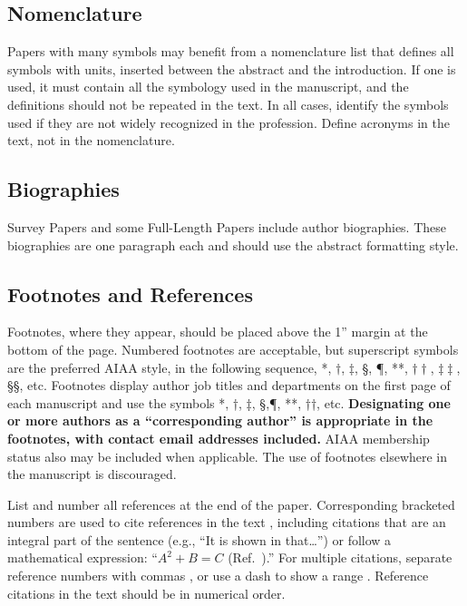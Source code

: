 \documentclass[journal ]{new-aiaa}
\begin{document}
\subsection{Nomenclature}
Papers with many symbols may benefit from a nomenclature list that defines all symbols with units, inserted between the abstract and the introduction. If one is used, it must contain all the symbology used in the manuscript, and the definitions should not be repeated in the text. In all cases, identify the symbols used if they are not widely recognized in the profession. Define acronyms in the text, not in the nomenclature. 

\subsection{Biographies}
Survey Papers and some Full-Length Papers include author biographies. These biographies are one paragraph each and should use the abstract formatting style.

\subsection{Footnotes and References}
Footnotes, where they appear, should be placed above the 1'' margin at the bottom of the page. Numbered footnotes are acceptable, but superscript symbols are the preferred AIAA style, in the following sequence, *, $\dag$, $\ddag$, \S, \P, **, $\dag\dag$, $\ddag\ddag$, \S\S, etc. Footnotes display author job titles and departments on the first page of each manuscript and use the symbols *, †, ‡, §,¶, **, ††, etc. \textbf{Designating one or more authors as a “corresponding author” is appropriate in the footnotes, with contact email addresses included.} AIAA membership status also may be included when applicable. The use of footnotes elsewhere in the manuscript is discouraged.

List and number all references at the end of the paper. Corresponding bracketed numbers are used to cite references in the text \cite{vatistas1986reverse}, including citations that are an integral part of the sentence (e.g., ``It is shown in \cite{dornheim1996planetary} that\ldots '') or follow a mathematical expression: ``$A^{2} + B = C$ (Ref.~\cite{terster1997nasa}).'' For multiple citations, separate reference numbers with commas \cite{peyret2012computational,oates1997aerothermodynamics}, or use a dash to show a range \cite{volpe1994techniques,thompsonspacecraft,chi1993fluid,brandis2016nonequi}. Reference citations in the text should be in numerical order. 
\end{document}

